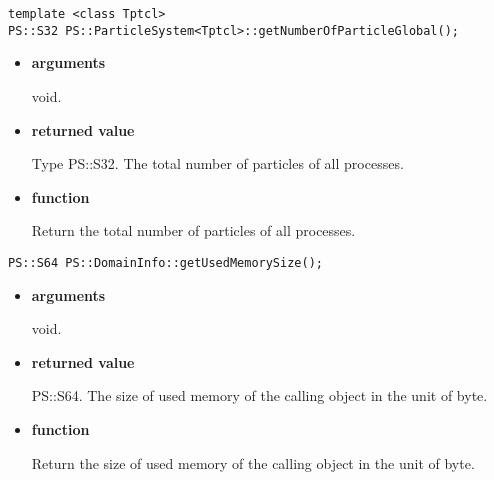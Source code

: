 \begin{screen}
\begin{verbatim}
template <class Tptcl>
PS::S32 PS::ParticleSystem<Tptcl>::getNumberOfParticleGlobal();
\end{verbatim}
\end{screen}

\begin{itemize}

\item {\bf arguments}

void.

\item {\bf returned value}

Type PS::S32. The total number of particles of all processes.


\item {\bf function}

Return the total number of particles of all processes.


\end{itemize}

\begin{screen}
\begin{verbatim}
PS::S64 PS::DomainInfo::getUsedMemorySize();
\end{verbatim}
\end{screen}

\begin{itemize}

\item {\bf arguments}

void.

\item {\bf returned value}

PS::S64. The size of used memory of the calling object in the unit of byte.

\item {\bf function}

Return the size of used memory of the calling object in the unit of byte.

\end{itemize}

\label{sec:ParticleSystem:IO}

